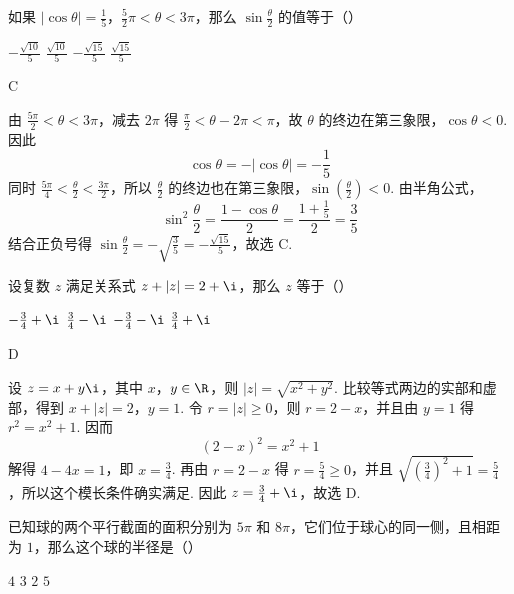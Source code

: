 \begin{problem}
如果 \(\left|\cos \theta\right| = \frac{1}{5}\)，\(\frac{5}{2}\pi < \theta < 3\pi\)，那么 \(\sin \frac{\theta}{2}\) 的值等于（\quad）

\choices
    {\(-\frac{\sqrt{10}}{5}\)}
    {\(\frac{\sqrt{10}}{5}\)}
    {\(-\frac{\sqrt{15}}{5}\)}
    {\(\frac{\sqrt{15}}{5}\)}
\end{problem}

\begin{answer}
C
\end{answer}

\begin{solution}
由 \(\frac{5\pi}{2}<\theta<3\pi\)，减去 \(2\pi\) 得 \(\frac\pi2<\theta-2\pi<\pi\)，故 \(\theta\) 的终边在第三象限，\(\cos\theta<0\). 因此
\[
\cos\theta=-|\cos\theta|=-\frac15
\]
同时 \(\frac{5\pi}{4}<\frac\theta2<\frac{3\pi}{2}\)，所以 \(\frac{\theta}{2}\) 的终边也在第三象限，\(\sin(\frac{\theta}{2})<0\). 由半角公式，
\[
\sin^2\frac{\theta}{2}=\frac{1-\cos\theta}{2}=\frac{1+\frac15}{2}=\frac35
\]
结合正负号得 \(\sin\frac{\theta}{2}=-\sqrt{\frac35}=-\frac{\sqrt{15}}5\)，故选 C.
\end{solution}

\begin{problem}
设复数 \(z\) 满足关系式 \(z + |z| = 2 + \i\)，那么 \(z\) 等于（\quad）

\choices
    {\(-\frac{3}{4} + \i\)}
    {\(\frac{3}{4} - \i\)}
    {\(-\frac{3}{4} - \i\)}
    {\(\frac{3}{4} + \i\)}
\end{problem}

\begin{answer}
D
\end{answer}

\begin{solution}
设 \(z=x+y\i\)，其中 \(x\)，\(y\in\R\)，则 \(|z|=\sqrt{x^2+y^2}\). 比较等式两边的实部和虚部，得到
\(x+|z|=2\)，\(y=1\).
令 \(r=|z|\geqslant0\)，则 \(r=2-x\)，并且由 \(y=1\) 得 \(r^2=x^2+1\). 因而
\[
(2-x)^2=x^2+1
\]
解得 \(4-4x=1\)，即 \(x=\frac34\). 再由 \(r=2-x\) 得 \(r=\frac54\geqslant0\)，并且 \(\sqrt{(\frac34)^2+1}=\frac54\)，所以这个模长条件确实满足. 因此 \(z=\frac34+\i\)，故选 D.
\end{solution}

\begin{problem}
已知球的两个平行截面的面积分别为 \(5\pi\) 和 \(8\pi\)，它们位于球心的同一侧，且相距为 \(1\)，那么这个球的半径是（\quad）

\choices
    {\(4\)}
    {\(3\)}
    {\(2\)}
    {\(5\)}
\end{problem}

